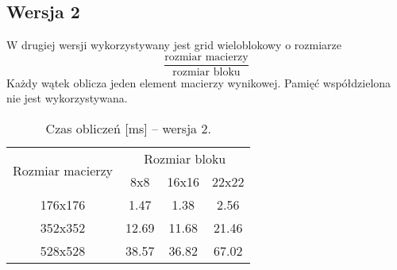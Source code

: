 
\subsection{Wersja 2}

W drugiej wersji wykorzystywany jest grid wieloblokowy o rozmiarze $$ \frac{\text{rozmiar macierzy}}{\text{rozmiar bloku}} $$
Każdy wątek oblicza jeden element macierzy wynikowej. Pamięć współdzielona nie jest wykorzystywana.



\begin{table}[H]
\centering
\begin{tabular}{|c|c|c|c|}
\hline
\multirow{2}{*}{Rozmiar macierzy} & \multicolumn{3}{c|}{Rozmiar bloku} \\ \cline{2-4}
& 8x8 & 16x16 & 22x22 \\ \hline
176x176 & 1.47 & 1.38 & 2.56 \\ \hline
352x352 & 12.69 & 11.68 & 21.46 \\ \hline
528x528 & 38.57 & 36.82 & 67.02 \\ \hline
\end{tabular}
\caption{Czas obliczeń [ms] -- wersja 2.}
\end{table}
